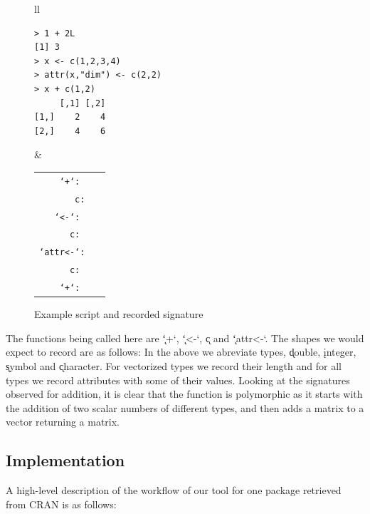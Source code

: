 \documentclass[acmsmall,10pt,review,anonymous]{acmart}\settopmatter{printfolios=true,printccs=false,printacmref=false}
\begin{document}
\begin{figure}[!hb]
\begin{tabular}{ll}\begin{minipage}{5cm}
{\small\begin{lstlisting}[style=R]
> 1 + 2L                     
[1] 3
> x <- c(1,2,3,4)            
> attr(x,"dim") <- c(2,2)    
> x + c(1,2)                 
     [,1] [,2]
[1,]    2    4
[2,]    4    6
\end{lstlisting}}
\end{minipage} & 
\begin{minipage}{8cm}\small
\begin{tabular}{rl}
\tt `+`: &\tt \sD \sI \to \sD \\
\tt c:& \sD \sD \sD \sD \to \D\\
\tt `<-`: &\tt \sY \D \to \D\\
\tt c: & \tt \sD \sD \to \D\\
\tt `attr<-`:&\tt  \sY \C \D \to \\
\tt c: &\tt \sD \sD \to \D\\
\tt `+`: &\tt \attr\D{dim=\D} \D \to \attr\D{dim=\D}
\end{tabular}
\end{minipage}
\end{tabular}
\caption{Example script and recorded signature}\label{example}\end{figure}

The functions being called here are \k{`+`}, \k{`<-`}, \k{c} and
\k{`attr<-`}.  The shapes we would expect to record are as follows:
In the above we abreviate types, \k{double}, \k{integer}, \k{symbol} and
\k{character}. For vectorized types we record their length and for all types
we record attributes with some of their values. Looking at the signatures
observed for addition, it is clear that the function is polymorphic as it
starts with the addition of two scalar numbers of different types, and then
adds a matrix to a vector returning a matrix.

\subsection{Implementation}

A high-level description of the workflow of our tool for one package
retrieved from CRAN is as follows:
\end{document}
